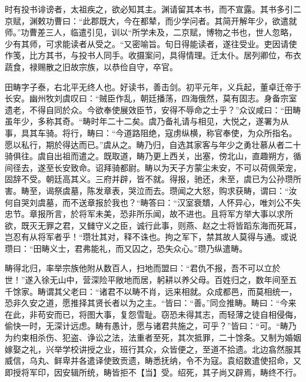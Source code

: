 \documentclass[12pt,UTF8]{ctexbook}
\begin{document}
时有投书诽谤者，太祖疾之，欲必知其主。渊请留其本书，而不宣露。其书多引二京赋，渊敕功曹曰：“此郡既大，今在都辇，而少学问者。其简开解年少，欲遣就师。”功曹差三人，临遣引见，训以“所学未及，二京赋，博物之书也，世人忽略，少有其师，可求能读者从受之。“又密喻旨。旬日得能读者，遂往受业。吏因请使作笺，比方其书，与投书人同手。收摄案问，具得情理。迁太仆。居列卿位，布衣蔬食，禄赐散之旧故宗族，以恭俭自守，卒官。

田畴字子泰，右北平无终人也。好读书，善击剑。初平元年，义兵起，董卓迁帝于长安。幽州牧刘虞叹曰：“贼臣作乱，朝廷播荡，四海俄然，莫有固志。身备宗室遗老，不得自同於众。今欲奉使展效臣节，安得不辱命之士乎？”众议咸曰：“田畴虽年少，多称其奇。“畴时年二十二矣。虞乃备礼请与相见，大悦之，遂署为从事，具其车骑。将行，畴曰：“今道路阻绝，寇虏纵横，称官奉使，为众所指名。愿以私行，期於得达而已。”虞从之。畴乃归，自选其家客与年少之勇壮慕从者二十骑俱往。虞自出祖而遣之。既取道，畴乃更上西关，出塞，傍北山，直趣朔方，循间径去，遂至长安致命。诏拜骑都尉。畴以为天子方蒙尘未安，不可以荷佩荣宠，固辞不受。朝廷高其义。三府并辟，皆不就。得报，驰还，未至，虞已为公孙瓒所害。畴至，谒祭虞墓，陈发章表，哭泣而去。瓒闻之大怒，购求获畴，谓曰：“汝何自哭刘虞墓，而不送章报於我也？“畴答曰：“汉室衰穨，人怀异心，唯刘公不失忠节。章报所言，於将军未美，恐非所乐闻，故不进也。且将军方举大事以求所欲，既灭无罪之君，又雠守义之臣，诚行此事，则燕、赵之士将皆蹈东海而死耳，岂忍有从将军者乎！“瓒壮其对，释不诛也。拘之军下，禁其故人莫得与通。或说瓒曰：“田畴义士，君弗能礼，而又囚之，恐失众心。”瓒乃纵遣畴。

畴得北归，率举宗族他附从数百人，扫地而盟曰：“君仇不报，吾不可以立於世！”遂入徐无山中，营深险平敞地而居，躬耕以养父母。百姓归之，数年间至五千馀家。畴谓其父老曰：“诸君不以畴不肖，远来相就。众成都邑，而莫相统一，恐非久安之道，愿推择其贤长者以为之主。“皆曰：“善。”同佥推畴。畴曰：“今来在此，非苟安而已，将图大事，复怨雪耻。窃恐未得其志，而轻薄之徒自相侵侮，偷快一时，无深计远虑。畴有愚计，愿与诸君共施之，可乎？”皆曰：“可。“畴乃为约束相杀伤、犯盗、诤讼之法，法重者至死，其次抵罪，二十馀条。又制为婚姻嫁娶之礼，兴举学校讲授之业，班行其众，众皆便之，至道不拾遗。北边翕然服其威信，乌丸、鲜卑并各遣译使致贡遗，畴悉抚纳，令不为寇。袁绍数遣使招命，又即授将军印，因安辑所统，畴皆拒不【当】受。绍死，其子尚又辟焉，畴终不行。
\end{document}
